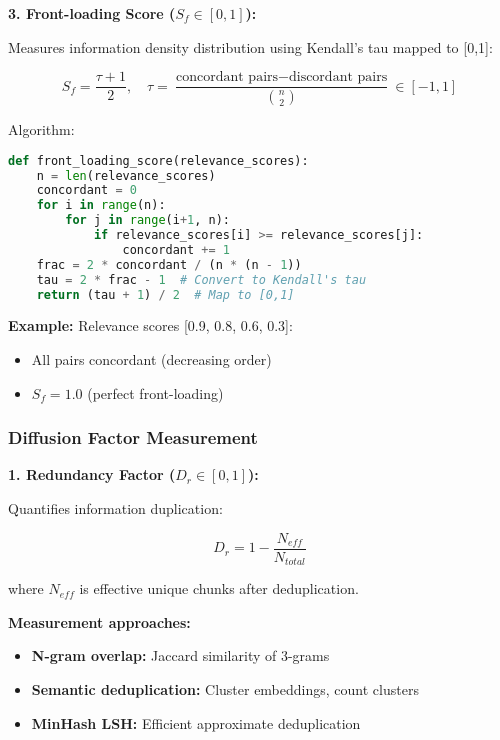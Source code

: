 \documentclass[conference]{IEEEtran}
\begin{document}
\textbf{3. Front-loading Score ($S_f \in [0,1]$):}

Measures information density distribution using Kendall's tau mapped to [0,1]:

\begin{equation}
S_f = \frac{\tau + 1}{2}, \quad \tau = \frac{\text{concordant pairs} - \text{discordant pairs}}{\binom{n}{2}} \in [-1,1]
\end{equation}

Algorithm:
\begin{lstlisting}[language=Python, basicstyle=\small]
def front_loading_score(relevance_scores):
    n = len(relevance_scores)
    concordant = 0
    for i in range(n):
        for j in range(i+1, n):
            if relevance_scores[i] >= relevance_scores[j]:
                concordant += 1
    frac = 2 * concordant / (n * (n - 1))
    tau = 2 * frac - 1  # Convert to Kendall's tau
    return (tau + 1) / 2  # Map to [0,1]
\end{lstlisting}

\textbf{Example:} Relevance scores [0.9, 0.8, 0.6, 0.3]:
\begin{itemize}
\item All pairs concordant (decreasing order)
\item $S_f = 1.0$ (perfect front-loading)
\end{itemize}

\subsubsection{Diffusion Factor Measurement}

\textbf{1. Redundancy Factor ($D_r \in [0,1]$):}

Quantifies information duplication:

\begin{equation}
D_r = 1 - \frac{N_{eff}}{N_{total}}
\end{equation}

where $N_{eff}$ is effective unique chunks after deduplication.

\textbf{Measurement approaches:}
\begin{itemize}
\item \textbf{N-gram overlap:} Jaccard similarity of 3-grams
\item \textbf{Semantic deduplication:} Cluster embeddings, count clusters
\item \textbf{MinHash LSH:} Efficient approximate deduplication
\end{itemize}
\end{document}
